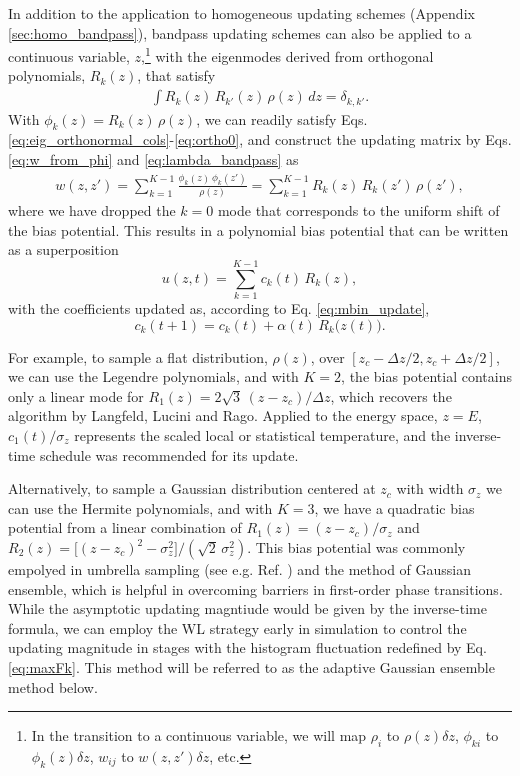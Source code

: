 \documentclass[reprint, superscriptaddress, floatfix]{revtex4-1}
\begin{document}
In addition to the application to homogeneous updating schemes
(Appendix \ref{sec:homo_bandpass}),
bandpass updating schemes can also be applied to
a continuous variable, $z$,\footnote{
  In the transition to a continuous variable,
  we will map
  $\rho_i$ to $\rho(z) \delta z$,
  $\phi_{ki}$ to $\phi_k(z) \delta z$,
  $w_{ij}$ to $w(z, z') \delta z$, etc.}
with the eigenmodes derived from orthogonal polynomials, $R_k(z)$,
that satisfy
\begin{align*}
  \int R_k(z) \, R_{k'}(z) \, \rho(z) \, d z = \delta_{k, k'}
  .
\end{align*}
%
With $\phi_k(z) = R_k(z) \, \rho(z)$,
we can readily satisfy Eqs. \eqref{eq:eig_orthonormal_cols}-\eqref{eq:ortho0},
and construct the updating matrix by
Eqs. \eqref{eq:w_from_phi} and \eqref{eq:lambda_bandpass} as
\begin{align*}
  w(z, z')
  =
  \sum_{k=1}^{K-1} \frac{ \phi_k(z) \, \phi_k(z') } { \rho(z) }
  = \sum_{k=1}^{K-1} R_k(z) \, R_k(z') \, \rho(z'),
\end{align*}
%
where we have dropped the $k=0$ mode
that corresponds to the uniform shift of the bias potential.
%
This results in a polynomial bias potential
that can be written as a superposition
$$
u(z, t) = \sum_{k=1}^{K-1} c_k(t) \, R_k(z),
$$
with the coefficients updated as, according to Eq. \eqref{eq:mbin_update},
$$
c_k(t+1) = c_k(t) + \alpha(t) \, R_k\bigl( z(t) \bigr).
$$


For example,
to sample a flat distribution, $\rho(z)$,
over $[z_c - \Delta z/2, z_c + \Delta z/2]$,
we can use the Legendre polynomials\cite{arfken},
and with $K = 2$,
the bias potential contains only a linear mode for
$R_1(z) = 2 \sqrt{3} \, (z - z_c)/\Delta z$,
which recovers the algorithm by
Langfeld, Lucini and Rago\cite{langfeld2012}.
%
Applied to the energy space, $z = E$,
$c_1(t)/\sigma_z$ represents the scaled local or
statistical temperature\cite{kim2006, *kim2007},
and the inverse-time schedule
was recommended for its update\cite{pellegrini2014}.

Alternatively,
to sample a Gaussian distribution
centered at $z_c$ with width $\sigma_z$
we can use the Hermite polynomials\cite{arfken},
and with $K=3$,
we have a quadratic bias potential
from a linear combination of
$R_1(z) = (z - z_c)/\sigma_z$
and
$R_2(z) = \bigl[(z - z_c)^2 - \sigma_z^2\bigr] /\left(\sqrt 2 \, \sigma_z^2\right)$.
%
This bias potential was commonly empolyed
in umbrella sampling (see e.g. Ref. \cite{zhu2012})
and the method of Gaussian ensemble\cite{hetherington1987,
*challa1988, *costeniuc2006, neuhaus2006, *neuhaus2007},
which is helpful in overcoming barriers
in first-order phase transitions.
%
While the asymptotic updating magntiude
would be given by the inverse-time formula,
we can employ the WL strategy early in simulation
to control the updating magnitude in stages
with the histogram fluctuation redefined by
Eq. \eqref{eq:maxFk}.
%
This method will be referred to as
the adaptive Gaussian ensemble method below.
\end{document}
